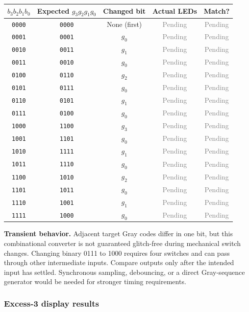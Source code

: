 \documentclass[a4paper,11pt]{article}
\newcommand{\pending}{\textcolor{gray}{Pending}}
\begin{document}
\begin{center}\small
\begin{tabular}{ccccc}
\toprule
$b_3b_2b_1b_0$ & Expected $g_3g_2g_1g_0$ & Changed bit & Actual LEDs & Match?\\\midrule
\texttt{0000} & \texttt{0000} & None (first) & \pending & \pending\\
\texttt{0001} & \texttt{0001} & $g_0$ & \pending & \pending\\
\texttt{0010} & \texttt{0011} & $g_1$ & \pending & \pending\\
\texttt{0011} & \texttt{0010} & $g_0$ & \pending & \pending\\
\texttt{0100} & \texttt{0110} & $g_2$ & \pending & \pending\\
\texttt{0101} & \texttt{0111} & $g_0$ & \pending & \pending\\
\texttt{0110} & \texttt{0101} & $g_1$ & \pending & \pending\\
\texttt{0111} & \texttt{0100} & $g_0$ & \pending & \pending\\
\texttt{1000} & \texttt{1100} & $g_3$ & \pending & \pending\\
\texttt{1001} & \texttt{1101} & $g_0$ & \pending & \pending\\
\texttt{1010} & \texttt{1111} & $g_1$ & \pending & \pending\\
\texttt{1011} & \texttt{1110} & $g_0$ & \pending & \pending\\
\texttt{1100} & \texttt{1010} & $g_2$ & \pending & \pending\\
\texttt{1101} & \texttt{1011} & $g_0$ & \pending & \pending\\
\texttt{1110} & \texttt{1001} & $g_1$ & \pending & \pending\\
\texttt{1111} & \texttt{1000} & $g_0$ & \pending & \pending\\
\bottomrule\end{tabular}\end{center}


\textbf{Transient behavior.} Adjacent target Gray codes differ in one bit,
but this combinational converter is not guaranteed glitch-free during mechanical
switch changes. Changing binary 0111 to 1000 requires four switches and can pass through
other intermediate inputs. Compare outputs only after the intended input has settled.
Synchronous sampling, debouncing, or a direct Gray-sequence generator would be needed
for stronger timing requirements.
\subsubsection*{Excess-3 display results}
\end{document}
